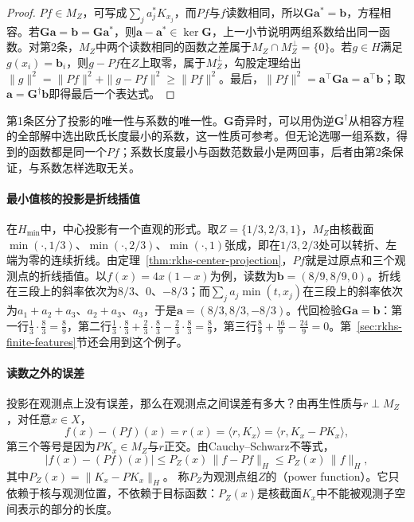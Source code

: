 \begin{proof}
$Pf\in M_Z$，可写成$\sum_ja_j^*K_{x_j}$，而$Pf$与$f$读数相同，所以$\bm G\bm a^*=\bm b$，方程相容。若$\bm G\bm a=\bm b=\bm G\bm a^*$，则$\bm a-\bm a^*\in\ker\bm G$，上一小节说明两组系数给出同一函数。对第2条，$M_Z$中两个读数相同的函数之差属于$M_Z\cap M_Z^\perp=\{0\}$。若$g\in H$满足$g(x_i)=\bm b_i$，则$g-Pf$在$Z$上取零，属于$M_Z^\perp$，勾股定理给出$\|g\|^2=\|Pf\|^2+\|g-Pf\|^2\ge\|Pf\|^2$。最后，$\|Pf\|^2=\bm a^{\top}\bm G\bm a=\bm a^{\top}\bm b$；取$\bm a=\bm G^{\dagger}\bm b$即得最后一个表达式。
\end{proof}

第1条区分了投影的唯一性与系数的唯一性。$\bm G$奇异时，可以用伪逆$\bm G^{\dagger}$从相容方程的全部解中选出欧氏长度最小的系数，这一性质可参考。但无论选哪一组系数，得到的函数都是同一个$Pf$；系数长度最小与函数范数最小是两回事，后者由第2条保证，与系数怎样选取无关。

\paragraph{最小值核的投影是折线插值}

在$H_{\min}$中，中心投影有一个直观的形式。取$Z=\{1/3,2/3,1\}$，$M_Z$由核截面$\min(\cdot,1/3)$、$\min(\cdot,2/3)$、$\min(\cdot,1)$张成，即在$1/3,2/3$处可以转折、左端为零的连续折线。由定理~\ref{thm:rkhs-center-projection}，$Pf$就是过原点和三个观测点的折线插值。以$f(x)=4x(1-x)$为例，读数为$\bm b=(8/9,8/9,0)$。折线在三段上的斜率依次为$8/3$、$0$、$-8/3$；而$\sum_ja_j\min(t,x_j)$在三段上的斜率依次为$a_1+a_2+a_3$、$a_2+a_3$、$a_3$，于是$\bm a=(8/3,8/3,-8/3)$。代回检验$\bm G\bm a=\bm b$：第一行$\tfrac13\cdot\tfrac83=\tfrac89$，第二行$\tfrac13\cdot\tfrac83+\tfrac23\cdot\tfrac83-\tfrac23\cdot\tfrac83=\tfrac89$，第三行$\tfrac89+\tfrac{16}9-\tfrac{24}9=0$。第~\ref{sec:rkhs-finite-features}节还会用到这个例子。

\paragraph{读数之外的误差}

投影在观测点上没有误差，那么在观测点之间误差有多大？由再生性质与$r\perp M_Z$，对任意$x\in X$，
\[
f(x)-(Pf)(x)=r(x)=\langle r,K_x\rangle=\langle r,K_x-PK_x\rangle ,
\]
第三个等号是因为$PK_x\in M_Z$与$r$正交。由Cauchy--Schwarz不等式，
\begin{equation}
|f(x)-(Pf)(x)|\le P_Z(x)\,\|f-Pf\|_H\le P_Z(x)\,\|f\|_H,
\label{eq:rkhs-power-bound}
\end{equation}
其中$P_Z(x)=\|K_x-PK_x\|_H$。
称$P_Z$为观测点组$Z$的（power function）。它只依赖于核与观测位置，不依赖于目标函数：$P_Z(x)$是核截面$K_x$中不能被观测子空间表示的部分的长度。

